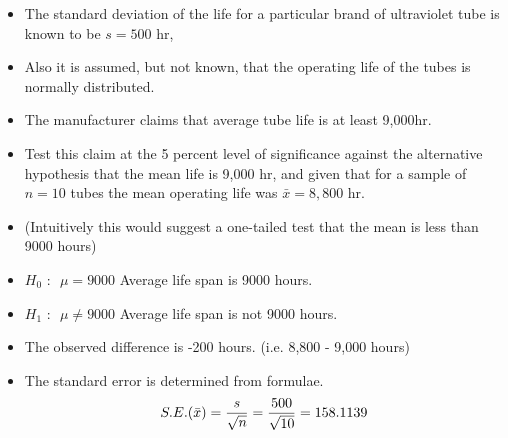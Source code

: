 \documentclass[a4paper,12pt]{article}
\begin{document}

\large
\begin{itemize}
\item The standard deviation of the life for a particular brand of ultraviolet tube is known to be $s = 500$ hr,
\item Also it is assumed, but not known, that the operating life of the tubes is normally distributed. \item The manufacturer claims that average tube life
is at least 9,000hr. \item Test this claim at the 5 percent level of significance against the alternative hypothesis
that the mean life is 9,000 hr, and given that for a sample of $n = 10$ tubes the mean operating
life was $\bar{x} = 8,800$ hr.
\item (Intuitively this would suggest a one-tailed test that the mean is less than 9000 hours)
\end{itemize}
\medskip 



\large
\begin{itemize}
\item $H_0 \mbox{ : } $ $\mu = 9000$ Average life span is 9000 hours.
\item $H_1 \mbox{ : } $ $\mu \neq 9000$ Average life span is not 9000 hours.
\end{itemize}
\bigskip
\begin{itemize}
\item The observed difference is -200 hours. (i.e. 8,800 - 9,000 hours)
\item The standard error is determined from formulae.
\[ S.E.(\bar{x}) = {s \over \sqrt{n}} = {500 \over \sqrt{10}}  = 158.1139 \]
\end{itemize}
\medskip 
\end{document}
